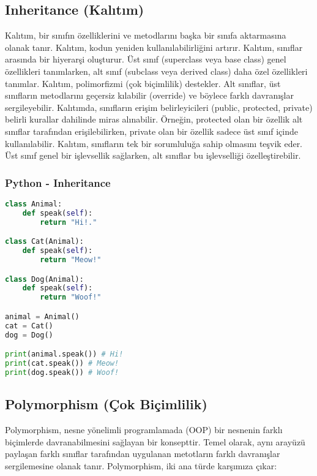 \newpage

\subsection{Inheritance (Kalıtım)}

Kalıtım, bir sınıfın özelliklerini ve metodlarını başka bir sınıfa aktarmasına olanak tanır. Kalıtım, kodun yeniden kullanılabilirliğini artırır. Kalıtım, sınıflar arasında bir hiyerarşi oluşturur. Üst sınıf (superclass veya base class) genel özellikleri tanımlarken, alt sınıf (subclass veya derived class) daha özel özellikleri tanımlar. Kalıtım, polimorfizmi (çok biçimlilik) destekler. Alt sınıflar, üst sınıfların metodlarını geçersiz kılabilir (override) ve böylece farklı davranışlar sergileyebilir. Kalıtımda, sınıfların erişim belirleyicileri (public, protected, private) belirli kurallar dahilinde miras alınabilir. Örneğin, protected olan bir özellik alt sınıflar tarafından erişilebilirken, private olan bir özellik sadece üst sınıf içinde kullanılabilir. Kalıtım, sınıfların tek bir sorumluluğa sahip olmasını teşvik eder. Üst sınıf genel bir işlevsellik sağlarken, alt sınıflar bu işlevselliği özelleştirebilir.

\subsubsection{Python - Inheritance}

\begin{lstlisting}[language=Python]
class Animal:
    def speak(self):
        return "Hi!."

class Cat(Animal):
    def speak(self):
        return "Meow!"

class Dog(Animal):
    def speak(self):
        return "Woof!"

animal = Animal()
cat = Cat()
dog = Dog()

print(animal.speak()) # Hi!
print(cat.speak()) # Meow!
print(dog.speak()) # Woof!
\end{lstlisting}

\newpage

\subsection{Polymorphism (Çok Biçimlilik)}

Polymorphism, nesne yönelimli programlamada (OOP) bir nesnenin farklı biçimlerde davranabilmesini sağlayan bir konsepttir. Temel olarak, aynı arayüzü paylaşan farklı sınıflar tarafından uygulanan metotların farklı davranışlar sergilemesine olanak tanır. Polymorphism, iki ana türde karşımıza çıkar:

